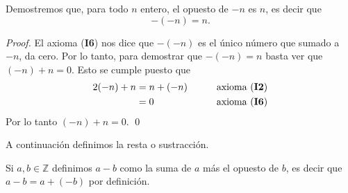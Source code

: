 \documentclass[handout]{beamer} %
\begin{document}



\begin{frame}\begin{ejemplo}\label{Ej.opuesto_opuesto} Demostremos que, para todo $n$ entero, el opuesto de $-n$ es $n$, es decir que 
    $$-(-n) = n.$$ 
    \end{ejemplo}
    \begin{proof} El axioma (\textbf{I6}) nos dice que $-(-n)$ es el único número que sumado a $-n$, da cero.  Por lo tanto, para demostrar que $-(-n) = n$ basta ver que $(-n)+n=0$. Esto se cumple puesto que 
    \begin{alignat*}2
    (-n)+n&=n+(-n) &\qquad &\text{axioma (\textbf{I2})} \\
    &=0&\qquad &\text{axioma (\textbf{I6})}
    \end{alignat*}
    Por lo tanto  $(-n)+n=0$. \qed
    \end{proof}
	
\end{frame}


\begin{frame} 
    
    A continuación definimos la resta o sustracción. 

    \begin{definicion} Si $a,b\in\mathbb{Z}$ definimos $a-b$ como la suma de $a$ más el opuesto de $b$, es decir que  $a-b=a+(-b)$ por definición.  
    \end{definicion}
    
    
    
	
\end{frame}
\end{document}
